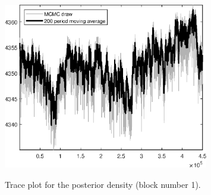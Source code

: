 \begin{figure}[H]
\centering
  \includegraphics[width=0.8\textwidth]{BRS_sectoral_wo_demand_shocks/graphs/TracePlot_Posterior_blck_1}\\
    \caption{Trace plot for the posterior density (block number 1).}
\end{figure}
